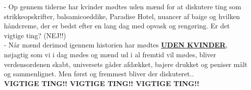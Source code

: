 - Op gennem tiderne har kvinder mødtes uden mænd for at diskutere ting som strikkeopskrifter, balsamicoeddike, Paradise Hotel, nuancer af baige og hvilken håndcreme, der er bedst efter en lang dag med opvask og rengøring. Er det vigtige ting? (NEJ!!)\\
- Når mænd derimod igennem historien har mødtes \underline{\textbf{UDEN KVINDER}}, nøjagtig som vi i dag mødes og mænd ud i al fremtid vil mødes, bliver verdensordenen skabt, universets gåder afdækket, bajere drukket og peniser målt og sammenlignet. Men først og fremmest bliver der diskuteret..\\
\textbf{VIGTIGE TING!! VIGTIGE TING!! VIGTIGE TING!!}